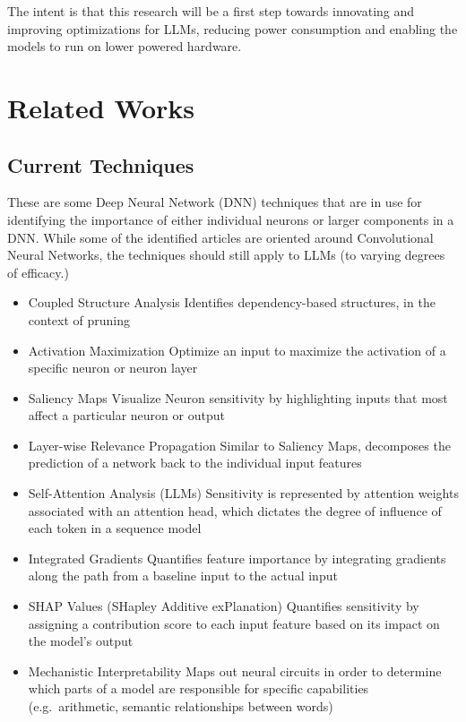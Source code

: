 \documentclass{article}
\begin{document}
The intent is that this research will be a first step towards innovating and improving optimizations for LLMs, reducing power consumption and enabling the models to run on lower powered hardware.

\section*{Related Works}
\subsection*{Current Techniques}
These are some Deep Neural Network (DNN) techniques that are in use for identifying the importance of either individual neurons or larger components in a DNN. While some of the identified articles are oriented around Convolutional Neural Networks, the techniques should still apply to LLMs (to varying degrees of efficacy.)

\begin{itemize}
    \item Coupled Structure Analysis
    \subitem Identifies dependency-based structures, in the context of pruning~\cite{ma2023llm}
    \item Activation Maximization
    \subitem Optimize an input to maximize the activation of a specific neuron or neuron layer
    \item Saliency Maps
    \subitem Visualize Neuron sensitivity by highlighting inputs that most affect a particular neuron or output~\cite{hsu2023explainable}
    \item Layer-wise Relevance Propagation
    \subitem Similar to Saliency Maps, decomposes the prediction of a network back to the individual input features~\cite{jia2022interpreting}
    \item Self-Attention Analysis (LLMs)
    \subitem Sensitivity is represented by attention weights associated with an attention head, which dictates the degree of influence of each token in a sequence model~\cite{shi2021sparsebert}
    \item Integrated Gradients
    \subitem Quantifies feature importance by integrating gradients along the path from a baseline input to the actual input~\cite{sundararajan2017axiomatic}
    \item SHAP Values (SHapley Additive exPlanation)
    \subitem Quantifies sensitivity by assigning a contribution score to each input feature based on its impact on the model’s output~\cite{nohara2022explanation}
    \item Mechanistic Interpretability
    \subitem Maps out neural circuits in order to determine which parts of a model are responsible for specific capabilities (e.g.\ arithmetic, semantic relationships between words)~\cite{singh2024rethinking}
\end{itemize}
\end{document}
